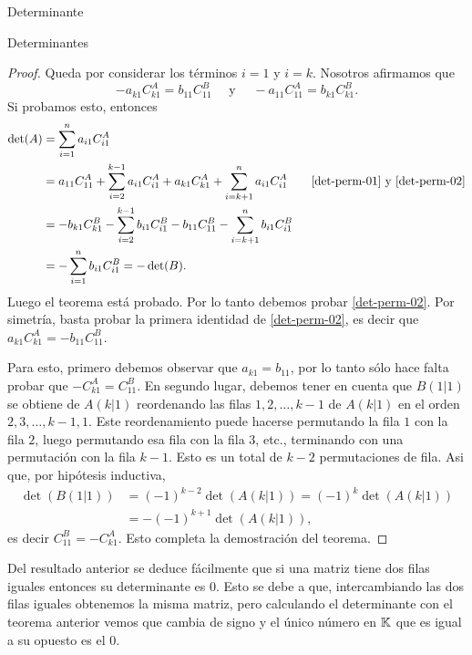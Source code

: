 \begin{chapter}{Determinante}
\begin{section}{Determinantes}
\begin{proof}
      Queda por considerar los términos $i = 1$ y $i = k$. Nosotros afirmamos que
      \begin{equation}\label{det-perm-02}
          -	a_{k1}C^A_{k1} =  b_{11}C^B_{11}  \quad \text{ y } \quad - a_{11}C^A_{11} = b_{k1}C^B_{k1}.
      \end{equation}
      Si probamos esto, entonces
      \begin{align*}
          \det(A) & = \sum_{i=1}^{n}  a_{i1}C^A_{i1}                                                                                                                                \\
                  & = a_{11}C^A_{11} +  \sum_{i=2}^{k-1}  a_{i1}C^A_{i1} + a_{k1}C^A_{k1} + \sum_{i=k+1}^{n}  a_{i1}C^A_{i1}\qquad \text{\eqref{det-perm-01} y \eqref{det-perm-02}} \\
                  & = -b_{k1}C^B_{k1} - \sum_{i=2}^{k-1}  b_{i1}C^B_{i1} - b_{11}C^B_{11} - \sum_{i=k+1}^{n}  b_{i1}C^B_{i1}                                                        \\
                  & = - \sum_{i=1}^{n}  b_{i1}C^B_{i1} =- \det(B).
      \end{align*}
      Luego el teorema está probado. Por lo tanto debemos probar \eqref{det-perm-02}. Por simetría, basta probar la primera identidad de \eqref{det-perm-02},  es decir  que $	a_{k1}C^A_{k1} = - b_{11}C^B_{11}$.

      Para esto, primero debemos observar que $a_{k1} = b_{11}$, por lo tanto sólo hace falta probar que $-C^A_{k1} = C^B_{11}$. En segundo lugar, debemos tener  en cuenta que $B(1|1)$ se obtiene de $A(k|1)$ reordenando las filas $1,2,\ldots, k -1$  de $A(k|1)$ en el orden $2,3, \ldots, k-1,1$. Este reordenamiento puede hacerse permutando la fila $1$ con la fila $2$, luego permutando esa fila con la fila $3$, etc., terminando con una permutación con la fila $k-1$. Esto es un total de $k - 2$  permutaciones de fila. Asi que, por hipótesis inductiva,
      \begin{align*}
          \det(B(1|1)) & = (-1)^{k-2}\det(A(k|1)) = (-1)^{k}\det(A(k|1)) \\
                       & = - (-1)^{k+1}\det(A(k|1)),
      \end{align*}
      es decir $C^B_{11} = -C^A_{k1}$. Esto completa la demostración del teorema.
  \end{proof}

  \begin{observacion*}
      Del resultado anterior se deduce fácilmente que si una matriz tiene dos filas iguales entonces su determinante es $0$. Esto se debe a que, intercambiando las dos filas iguales obtenemos la misma matriz, pero calculando el determinante con el teorema anterior vemos que cambia de signo y el único número en $\mathbb K$ que es igual a su opuesto es el $0$.
  \end{observacion*}


\end{section}
\end{chapter}
